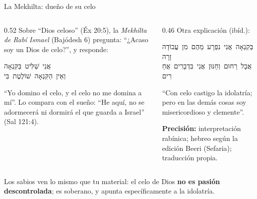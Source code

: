 \documentclass[hyperref={bookmarks=false},aspectratio=169]{beamer}
\newcommand{\heb}[1]{\mbox{\foreignlanguage{hebrew}{#1}}}
\newcommand{\destacar}[1]{\textbf{\textcolor{azul}{#1}}}
\newcommand{\precision}[1]{{\footnotesize\color{gris}\textbf{Precisión:} #1}}
\begin{document}
\begin{frame}{La Mekhilta: dueño de su celo}
\begin{columns}[t,onlytextwidth]
\begin{column}{0.52\textwidth}\small
Sobre ``Dios celoso'' (Éx 20:5), la \emph{Mekhilta de Rabí Ismael} (Bajódesh 6) pregunta: ``¿Acaso soy un Dios de celo?'', y responde:
\begin{center}\heb{אֲנִי שַׁלִּיט בַּקִּנְאָה}\\ \heb{וְאֵין הַקִּנְאָה שׁוֹלֶטֶת בִּי}\end{center}
``Yo domino el celo, y el celo no me domina a mí''. Lo compara con el sueño: ``He aquí, no se adormecerá ni dormirá el que guarda a Israel'' (Sal 121:4).
\end{column}
\begin{column}{0.46\textwidth}\small
Otra explicación (ibíd.):
\begin{center}\heb{בְּקִנְאָה אֲנִי נִפְרָע מֵהֶם מִן עֲבוֹדָה זָרָה}\\ \heb{אֲבָל רַחוּם וְחַנּוּן אֲנִי בִּדְבָרִים אֲחֵרִים}\end{center}
``Con celo castigo la idolatría; pero en las demás cosas soy misericordioso y clemente''.\par\smallskip
\precision{interpretación rabínica; hebreo según la edición Beeri (Sefaria); traducción propia.}
\end{column}
\end{columns}\par\medskip
\small\RaggedRight Los sabios ven lo mismo que tu material: el celo de Dios \destacar{no es pasión descontrolada}; es soberano, y apunta específicamente a la idolatría.
\end{frame}
\end{document}
